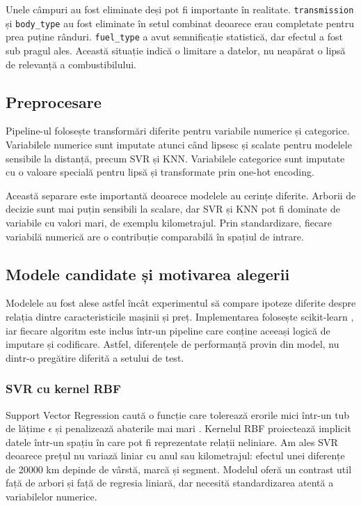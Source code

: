 Unele câmpuri au fost eliminate deși pot fi importante în realitate. \texttt{transmission} și \texttt{body\_type} au fost eliminate în setul combinat deoarece erau completate pentru prea puține rânduri. \texttt{fuel\_type} a avut semnificație statistică, dar efectul a fost sub pragul ales. Această situație indică o limitare a datelor, nu neapărat o lipsă de relevanță a combustibilului.

\subsection{Preprocesare}
\label{sec:models-preprocessing}

Pipeline-ul folosește transformări diferite pentru variabile numerice și categorice. Variabilele numerice sunt imputate atunci când lipsesc și scalate pentru modelele sensibile la distanță, precum SVR și KNN. Variabilele categorice sunt imputate cu o valoare specială pentru lipsă și transformate prin one-hot encoding.

Această separare este importantă deoarece modelele au cerințe diferite. Arborii de decizie sunt mai puțin sensibili la scalare, dar SVR și KNN pot fi dominate de variabile cu valori mari, de exemplu kilometrajul. Prin standardizare, fiecare variabilă numerică are o contribuție comparabilă în spațiul de intrare.

\subsection{Modele candidate și motivarea alegerii}
\label{sec:models-candidates}

Modelele au fost alese astfel încât experimentul să compare ipoteze diferite despre relația dintre caracteristicile mașinii și preț. Implementarea folosește scikit-learn \cite{pedregosa2011scikit}, iar fiecare algoritm este inclus într-un pipeline care conține aceeași logică de imputare și codificare. Astfel, diferențele de performanță provin din model, nu dintr-o pregătire diferită a setului de test.

\subsubsection{SVR cu kernel RBF}

Support Vector Regression caută o funcție care tolerează erorile mici într-un tub de lățime \(\epsilon\) și penalizează abaterile mai mari \cite{smola2004tutorial}. Kernelul RBF proiectează implicit datele într-un spațiu în care pot fi reprezentate relații neliniare. Am ales SVR deoarece prețul nu variază liniar cu anul sau kilometrajul: efectul unei diferențe de 20000 km depinde de vârstă, marcă și segment. Modelul oferă un contrast util față de arbori și față de regresia liniară, dar necesită standardizarea atentă a variabilelor numerice.

